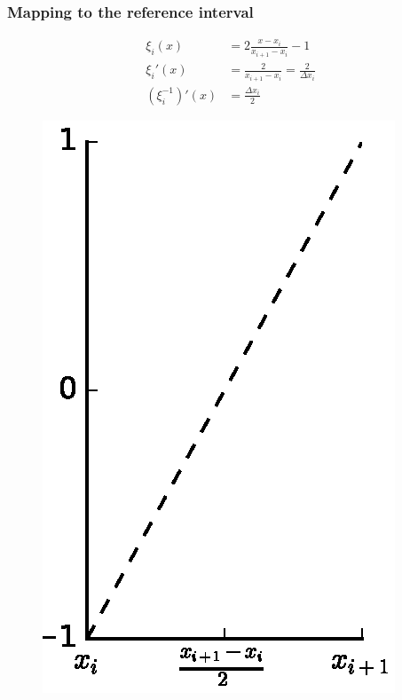 \documentclass[11pt]{beamer}
\begin{document}
\begin{frame}
  \frametitle{Mapping to the reference interval}
  \begin{minipage}{0.7\textwidth}
    \begin{align*}
      \xi_{i}(x) & = 2 \frac{x - x_{i}}{x_{i + 1} - x_{i}} - 1\\
      \xi_{i}'(x) & = \frac{2}{x_{i + 1} - x_{i}} = \frac{2}{\Delta x_{i}}\\
      (\xi_{i}^{-1})'(x) & = \frac{\Delta x_{i}}{2}
    \end{align*}


  \end{minipage}%
  \begin{minipage}{0.3\textwidth}
    \vspace{1em}
    \begin{figure}
      \centering
      \includegraphics[width=\textwidth]{figures/dg/xi}
    \end{figure}
  \end{minipage}
\end{frame}
\end{document}
